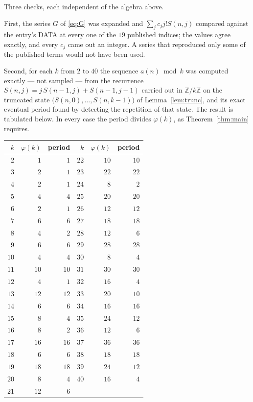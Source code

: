\documentclass[11pt,a4paper]{article}
\theoremstyle{plain}
\theoremstyle{definition}
\begin{document}
Three checks, each independent of the algebra above.

First, the series $G$ of \eqref{eq:G} was expanded and $\sum_j c_j j! S(n,j)$ compared
against the entry's DATA at every one of the $19$ published indices; the values
agree exactly, and every $c_j$ came out an integer. A series that reproduced only some of
the published terms would not have been used.

Second, for each $k$ from $2$ to $40$ the sequence $a(n)\bmod k$ was computed exactly
--- not sampled --- from the recurrence $S(n,j)=j\,S(n-1,j)+S(n-1,j-1)$ carried out in
$\mathbb{Z}/k\mathbb{Z}$ on the truncated state
$\bigl(S(n,0),\dots,S(n,k-1)\bigr)$ of Lemma~\ref{lem:trunc}, and its exact eventual
period found by detecting the repetition of that state. The result is tabulated below.
In every case the period divides $\varphi(k)$, as Theorem~\ref{thm:main} requires.

\begin{center}\small
\begin{tabular}{rrr@{\qquad\qquad}rrr}
$k$ & $\varphi(k)$ & period & $k$ & $\varphi(k)$ & period \\ \hline
$2$ & $1$ & $1$ & $22$ & $10$ & $10$ \\
$3$ & $2$ & $1$ & $23$ & $22$ & $22$ \\
$4$ & $2$ & $1$ & $24$ & $8$ & $2$ \\
$5$ & $4$ & $4$ & $25$ & $20$ & $20$ \\
$6$ & $2$ & $1$ & $26$ & $12$ & $12$ \\
$7$ & $6$ & $6$ & $27$ & $18$ & $18$ \\
$8$ & $4$ & $2$ & $28$ & $12$ & $6$ \\
$9$ & $6$ & $6$ & $29$ & $28$ & $28$ \\
$10$ & $4$ & $4$ & $30$ & $8$ & $4$ \\
$11$ & $10$ & $10$ & $31$ & $30$ & $30$ \\
$12$ & $4$ & $1$ & $32$ & $16$ & $4$ \\
$13$ & $12$ & $12$ & $33$ & $20$ & $10$ \\
$14$ & $6$ & $6$ & $34$ & $16$ & $16$ \\
$15$ & $8$ & $4$ & $35$ & $24$ & $12$ \\
$16$ & $8$ & $2$ & $36$ & $12$ & $6$ \\
$17$ & $16$ & $16$ & $37$ & $36$ & $36$ \\
$18$ & $6$ & $6$ & $38$ & $18$ & $18$ \\
$19$ & $18$ & $18$ & $39$ & $24$ & $12$ \\
$20$ & $8$ & $4$ & $40$ & $16$ & $4$ \\
$21$ & $12$ & $6$ &  & & \\
\end{tabular}
\end{center}
\end{document}
